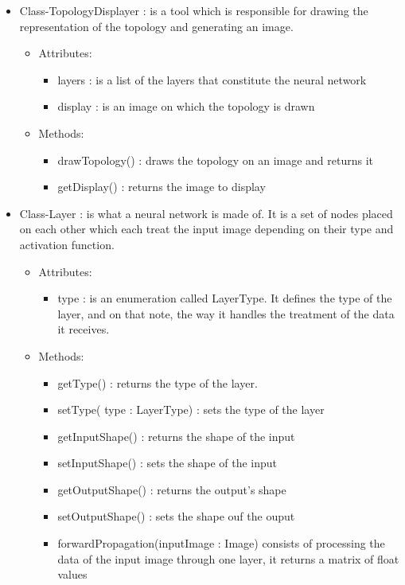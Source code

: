 \documentclass[parskip=full]{scrartcl}
\begin{document}
\begin{itemize}
	\item Class-TopologyDisplayer : is a tool which is responsible for drawing the representation of the topology and generating an image.
	\begin{itemize}
		\item Attributes:
		\begin{itemize}
			\item layers : is a list of the layers that constitute the neural network
			\item display : is an image on which the topology is drawn
		\end{itemize}
		\item Methods:
		\begin{itemize}
			\item drawTopology() : draws the topology on an image and returns it
			\item getDisplay() : returns the image to display
		\end{itemize}
	\end{itemize}


	\item Class-Layer : is what a neural network is made of. It is a set of nodes placed on each other which each treat the input image depending on their type and activation function.
	\begin{itemize}
		\item Attributes:
		\begin{itemize}
			\item type : is an enumeration called LayerType. It defines the type of the layer, and on that note, the way it handles the treatment of the data it receives.
		\end{itemize}
		\item Methods:
		\begin{itemize}
			\item getType() : returns the type of the layer.
			\item setType( type : LayerType) : sets the type of the layer
			\item getInputShape() : returns the shape of the input
			\item setInputShape() : sets the shape of the input
			\item getOutputShape() : returns the output's shape
			\item setOutputShape() : sets the shape ouf the ouput
			\item forwardPropagation(inputImage : Image) consists of processing the data of the input image through one layer, it returns a matrix of float values
		\end{itemize}
	\end{itemize}
\end{itemize}
\end{document}
